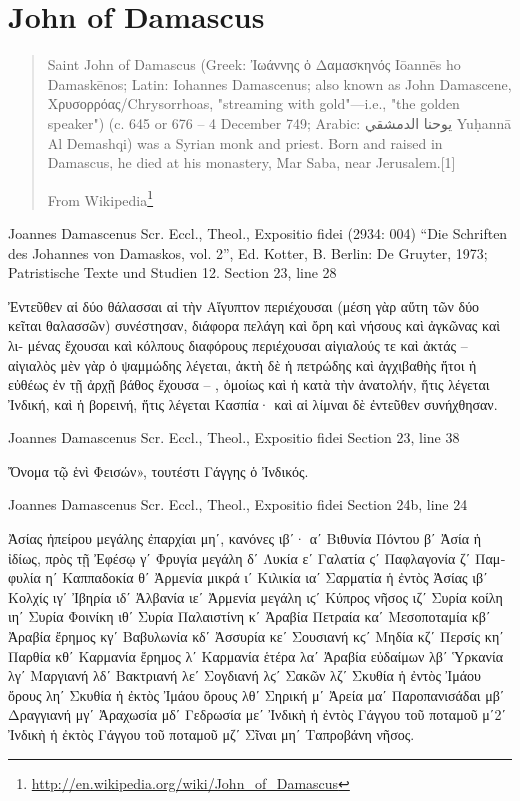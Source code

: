 \documentclass[12pt,letterpaper,twoside,final]{memoir}
\begin{document}
\section{John of Damascus}
\blockquote[From Wikipedia\footnote{\url{http://en.wikipedia.org/wiki/John_of_Damascus}}]{Saint John of Damascus (Greek: Ἰωάννης ὁ Δαμασκηνός Iōannēs ho Damaskēnos; Latin: Iohannes Damascenus; also known as John Damascene, Χρυσορρόας/Chrysorrhoas, "streaming with gold"—i.e., "the golden speaker") (c. 645 or 676 – 4 December 749; Arabic: يوحنا الدمشقي Yuḥannā Al Demashqi) was a Syrian monk and priest. Born and raised in Damascus, he died at his monastery, Mar Saba, near Jerusalem.[1]}
\begin{greek}

Joannes Damascenus Scr. Eccl., Theol., Expositio fidei (2934: 004)
“Die Schriften des Johannes von Damaskos, vol. 2”, Ed. Kotter, B.
Berlin: De Gruyter, 1973; Patristische Texte und Studien 12.
Section 23, line 28

                                        Ἐντεῦθεν αἱ δύο θάλασσαι αἱ τὴν 
Αἴγυπτον περιέχουσαι (μέση γὰρ αὕτη τῶν δύο κεῖται θαλασσῶν) 
συνέστησαν, διάφορα πελάγη καὶ ὄρη καὶ νήσους καὶ ἀγκῶνας καὶ λι-
μένας ἔχουσαι καὶ κόλπους διαφόρους περιέχουσαι αἰγιαλούς τε καὶ 
ἀκτάς – αἰγιαλὸς μὲν γὰρ ὁ ψαμμώδης λέγεται, ἀκτὴ δὲ ἡ πετρώδης καὶ 
ἀγχιβαθὴς ἤτοι ἡ εὐθέως ἐν τῇ ἀρχῇ βάθος ἔχουσα – , ὁμοίως καὶ ἡ 
κατὰ τὴν ἀνατολήν, ἥτις λέγεται Ἰνδική, καὶ ἡ βορεινή, ἥτις λέγεται 
Κασπία· καὶ αἱ λίμναι δὲ ἐντεῦθεν συνήχθησαν. 



Joannes Damascenus Scr. Eccl., Theol., Expositio fidei 
Section 23, line 38

  Ὄνομα τῷ ἑνὶ Φεισών», τουτέστι Γάγγης ὁ Ἰνδικός. 



Joannes Damascenus Scr. Eccl., Theol., Expositio fidei 
Section 24b, line 24

Ἀσίας ἠπείρου μεγάλης ἐπαρχίαι μηʹ, κανόνες ιβʹ· αʹ Βιθυνία Πόντου βʹ Ἀσία ἡ 
ἰδίως, πρὸς τῇ Ἐφέσῳ γʹ Φρυγία μεγάλη δʹ Λυκία εʹ Γαλατία ϛʹ Παφλαγονία ζʹ 
Παμφυλία ηʹ Καππαδοκία θʹ Ἀρμενία μικρά ιʹ Κιλικία ιαʹ Σαρματία ἡ ἐντὸς Ἀσίας ιβʹ 
Κολχίς ιγʹ Ἰβηρία ιδʹ Ἀλβανία ιεʹ Ἀρμενία μεγάλη ιϛʹ Κύπρος νῆσος ιζʹ Συρία 
κοίλη ιηʹ Συρία Φοινίκη ιθʹ Συρία Παλαιστίνη κʹ Ἀραβία Πετραία καʹ Μεσοποταμία 
κβʹ Ἀραβία ἔρημος κγʹ Βαβυλωνία κδʹ Ἀσσυρία κεʹ Σουσιανή κϛʹ Μηδία κζʹ 
Περσίς κηʹ Παρθία κθʹ Καρμανία ἔρημος λʹ Καρμανία ἑτέρα λαʹ Ἀραβία εὐδαίμων λβʹ 
Ὑρκανία λγʹ Μαργιανή λδʹ Βακτριανή λεʹ Σογδιανή λϛʹ Σακῶν λζʹ Σκυθία ἡ ἐντὸς 
Ἰμάου ὄρους ληʹ Σκυθία ἡ ἐκτὸς Ἰμάου ὄρους λθʹ Σηρική μʹ Ἀρεία μαʹ Παροπανισάδαι 
μβʹ Δραγγιανή μγʹ Ἀραχωσία μδʹ Γεδρωσία μεʹ Ἰνδικὴ ἡ ἐντὸς Γάγγου τοῦ 
ποταμοῦ μʹ2ʹ Ἰνδικὴ ἡ ἐκτὸς Γάγγου τοῦ ποταμοῦ μζʹ Σῖναι μηʹ Ταπροβάνη νῆσος. 




\end{greek}
\end{document}
